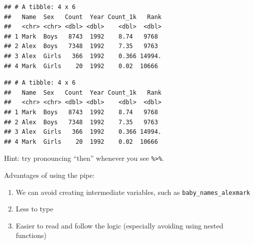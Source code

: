 \documentclass[]{book}
\newenvironment{Shaded}{\begin{snugshade}}{\end{snugshade}}
\newcommand{\CommentTok}[1]{\textcolor[rgb]{0.56,0.35,0.01}{\textit{#1}}}
\newcommand{\DecValTok}[1]{\textcolor[rgb]{0.00,0.00,0.81}{#1}}
\newcommand{\KeywordTok}[1]{\textcolor[rgb]{0.13,0.29,0.53}{\textbf{#1}}}
\newcommand{\NormalTok}[1]{#1}
\newcommand{\OperatorTok}[1]{\textcolor[rgb]{0.81,0.36,0.00}{\textbf{#1}}}
\newcommand{\StringTok}[1]{\textcolor[rgb]{0.31,0.60,0.02}{#1}}
\providecommand{\tightlist}{%
  \setlength{\itemsep}{0pt}\setlength{\parskip}{0pt}}
\begin{document}
\begin{verbatim}
## # A tibble: 4 x 6
##   Name  Sex   Count  Year Count_1k   Rank
##   <chr> <chr> <dbl> <dbl>    <dbl>  <dbl>
## 1 Mark  Boys   8743  1992    8.74   9768 
## 2 Alex  Boys   7348  1992    7.35   9763 
## 3 Alex  Girls   366  1992    0.366 14994.
## 4 Mark  Girls    20  1992    0.02  10666
\end{verbatim}

\begin{Shaded}
\end{Shaded}

\begin{verbatim}
## # A tibble: 4 x 6
##   Name  Sex   Count  Year Count_1k   Rank
##   <chr> <chr> <dbl> <dbl>    <dbl>  <dbl>
## 1 Mark  Boys   8743  1992    8.74   9768 
## 2 Alex  Boys   7348  1992    7.35   9763 
## 3 Alex  Girls   366  1992    0.366 14994.
## 4 Mark  Girls    20  1992    0.02  10666
\end{verbatim}

Hint: try pronouncing ``then'' whenever you see \texttt{\%\textgreater{}\%}.

\begin{Shaded}
\end{Shaded}

Advantages of using the pipe:

\begin{enumerate}
\def\labelenumi{\arabic{enumi}.}
\tightlist
\item
  We can avoid creating intermediate variables, such as \texttt{baby\_names\_alexmark}
\item
  Less to type
\item
  Easier to read and follow the logic (especially avoiding using nested functions)
\end{enumerate}
\end{document}
